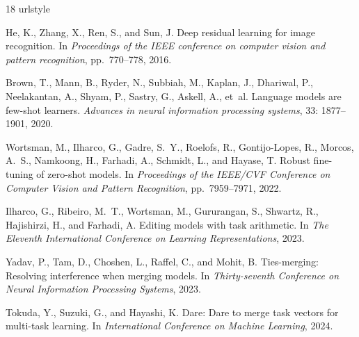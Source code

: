 \documentclass{article}
\theoremstyle{plain}
\theoremstyle{definition}
\theoremstyle{remark}
\begin{document}
\begin{thebibliography}{18}
\providecommand{\natexlab}[1]{#1}
\providecommand{\url}[1]{\texttt{#1}}
\expandafter\ifx\csname urlstyle\endcsname\relax
  \providecommand{\doi}[1]{doi: #1}\else
  \providecommand{\doi}{doi: \begingroup \urlstyle{rm}\Url}\fi

He, K., Zhang, X., Ren, S., and Sun, J.
\newblock Deep residual learning for image recognition.
\newblock In \emph{Proceedings of the IEEE conference on computer vision and pattern recognition}, pp.\ 770--778, 2016.

Brown, T., Mann, B., Ryder, N., Subbiah, M., Kaplan, J., Dhariwal, P., Neelakantan, A., Shyam, P., Sastry, G., Askell, A., et~al.
\newblock Language models are few-shot learners.
\newblock \emph{Advances in neural information processing systems}, 33: 1877--1901, 2020.

Wortsman, M., Ilharco, G., Gadre, S.~Y., Roelofs, R., Gontijo-Lopes, R., Morcos, A.~S., Namkoong, H., Farhadi, A., Schmidt, L., and Hayase, T.
\newblock Robust fine-tuning of zero-shot models.
\newblock In \emph{Proceedings of the IEEE/CVF Conference on Computer Vision and Pattern Recognition}, pp.\ 7959--7971, 2022.

Ilharco, G., Ribeiro, M.~T., Wortsman, M., Gururangan, S., Shwartz, R., Hajishirzi, H., and Farhadi, A.
\newblock Editing models with task arithmetic.
\newblock In \emph{The Eleventh International Conference on Learning Representations}, 2023.

Yadav, P., Tam, D., Choshen, L., Raffel, C., and Mohit, B.
\newblock Ties-merging: Resolving interference when merging models.
\newblock In \emph{Thirty-seventh Conference on Neural Information Processing Systems}, 2023.

Tokuda, Y., Suzuki, G., and Hayashi, K.
\newblock Dare: Dare to merge task vectors for multi-task learning.
\newblock In \emph{International Conference on Machine Learning}, 2024.


\end{thebibliography}
\end{document}
